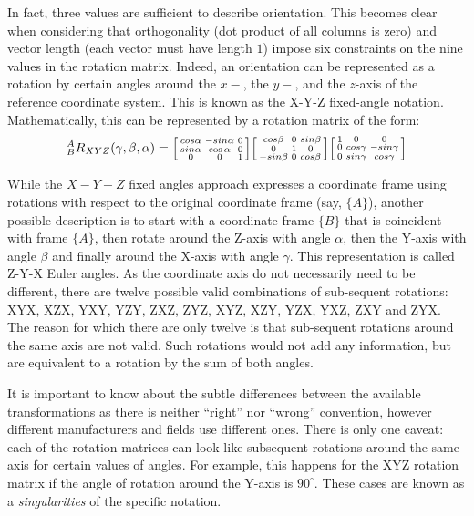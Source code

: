 In fact, three values are sufficient to describe orientation.
This becomes clear when considering that orthogonality (dot product of all columns is zero) and vector length (each vector must have length $1$) impose six constraints on the nine values in the rotation matrix.
Indeed, an orientation can be represented as a rotation by certain angles around the $x-$, the $y-$, and the $z$-axis of the reference coordinate system. This is known as the X-Y-Z fixed-angle notation. Mathematically, this can be represented by a rotation matrix of the form:
\begin{equation}
^A_BR_{XYZ}(\gamma,\beta,\alpha)=\begin{bsmallmatrix}cos\alpha & -sin\alpha & 0\\sin\alpha & \cos\alpha & 0\\0 & 0 & 1\end{bsmallmatrix}\begin{bsmallmatrix}cos\beta& 0 & sin\beta\\0 & 1 & 0\\-sin\beta & 0 & cos\beta\end{bsmallmatrix}\begin{bsmallmatrix}1 & 0 & 0 \\ 0 & cos\gamma & -sin\gamma\\0 & sin\gamma & cos\gamma\end{bsmallmatrix}
\end{equation}

While the $X-Y-Z$ fixed angles approach expresses a coordinate frame using rotations with respect to the original coordinate frame (say, $\{A\}$), another possible description is to start with a coordinate frame $\{B\}$ that is coincident with frame $\{A\}$, then rotate around the Z-axis with angle $ \alpha$, then the Y-axis with angle $ \beta$ and finally around the X-axis with angle $ \gamma$. This representation is called Z-Y-X Euler angles.
As the coordinate axis do not necessarily need to be different, there are twelve possible valid combinations of sub-sequent rotations: XYX, XZX, YXY, YZY, ZXZ, ZYZ, XYZ, XZY, YZX, YXZ, ZXY and ZYX.
The reason for which there are only twelve is that sub-sequent rotations around the same axis are not valid. Such rotations would not add any information, but are equivalent to a rotation by the sum of both angles.

It is important to know about the subtle differences between the available transformations as there is neither ``right'' nor ``wrong'' convention, however different manufacturers and fields use different ones.
There is only one caveat: each of the rotation matrices can look like subsequent rotations around the same axis for certain values of angles. For example, this happens for the XYZ rotation matrix if the angle of rotation around the Y-axis is $90^\circ$. These cases are known as a \emph{singularities} of the specific notation.

